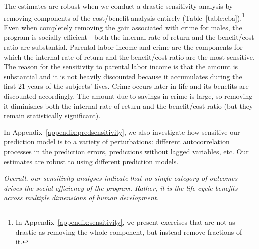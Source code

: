 The estimates are robust when we conduct a drastic sensitivity analysis by removing components of the cost/benefit analysis entirely (Table~\ref{table:cba}).\footnote{In  Appendix~\ref{appendix:sensitivity}, we present exercises that are not as drastic as removing the whole component, but instead remove fractions of it.} Even when completely removing the gain associated with crime for males, the program is socially efficient---both the internal rate of return and the benefit/cost ratio are substantial. Parental labor income and crime are the components for which the internal rate of return and the benefit/cost ratio are the most sensitive. The reason for the sensitivity to parental labor income is that the amount is substantial and it is not heavily discounted because it accumulates during the first $21$ years of the subjects' lives. Crime occurs later in life and its benefits are discounted accordingly. The amount due to savings in crime is large, so removing it diminishes both the internal rate of return and the benefit/cost ratio (but they remain statistically significant).

In  Appendix~\ref{appendix:predsensitivity}, we also investigate how sensitive our prediction model is to a variety of perturbations: different autocorrelation processes in the prediction errors, predictions without lagged variables, etc. Our estimates are robust to using different prediction models.

\textit{Overall, our sensitivity analyses indicate that no single category of outcomes drives the social efficiency of the program. Rather, it is the life-cycle benefits across multiple dimensions of human development.}

